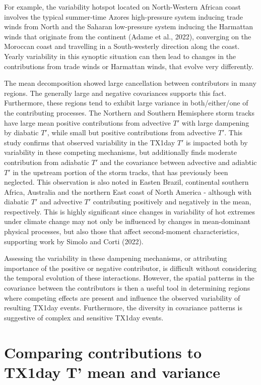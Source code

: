 \documentclass[11pt,a4paper,twoside,openright]{report}
\theoremstyle{definition}
\begin{document}
For example, the variability hotspot located on North-Western African coast involves the typical summer-time Azores high-pressure system inducing trade winds from North and the Saharan low-pressure system inducing the Harmattan winds that originate from the continent (Adame et al., 2022), converging on the Moroccan coast and travelling in a South-westerly direction along the coast. Yearly variability in this synoptic situation can then lead to changes in the contributions from trade winds or Harmattan winds, that evolve very differently.

The mean decomposition showed large cancellation between contributors in many regions. The generally large and negative covariances supports this fact. Furthermore, these regions tend to exhibit large variance in both/either/one of the contributing processes. The Northern and Southern Hemisphere storm tracks have large mean positive contributions from advective \(T'\) with large dampening by diabatic \(T'\), while small but positive contributions from advective \(T'\). This study confirms that observed variability in the TX1day \(T'\) is impacted both by variability in these competing mechanisms, but additionally finds moderate contribution from adiabatic \(T'\) and the covariance between advective and adiabtic \(T'\) in the upstream portion of the storm tracks, that has previously been neglected. This observation is also noted in Easten Brazil, continental southern Africa, Australia and the northern East coast of North America - although with diabatic \(T'\) and advective \(T'\) contributing positively and negatively in the mean, respectively. This is highly significant since changes in variability of hot extremes under climate change may not only be influenced by changes in mean-dominant physical processes, but also those that affect second-moment characteristics, supporting work by Simolo and Corti (2022).

Assessing the variability in these dampening mechanisms, or attributing importance of the positive or negative contributor, is difficult without considering the temporal evolution of these interactions. However, the spatial patterns in the covariance between the contributors is then a useful tool in determining regions where competing effects are present and influence the observed variability of resulting TX1day events. Furthermore, the diversity in covariance patterns is suggestive of complex and sensitive TX1day events.

\section{Comparing contributions to TX1day T' mean and variance}\label{comparing-contributions-to-tx1day-t-mean-and-variance}
\end{document}
